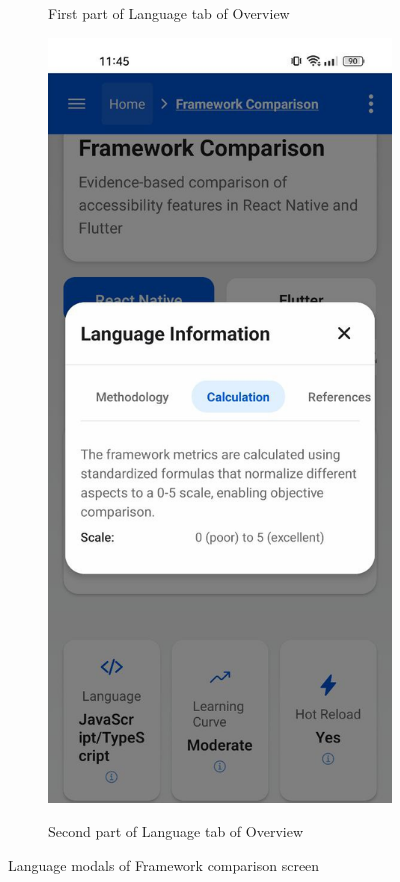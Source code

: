 \begin{figure}[ht]
\begin{subfigure}[b]{0.48\textwidth}
        \caption{First part of Language tab of Overview}
        \label{fig:language-1}
    \end{subfigure}
    \hfill
    \begin{subfigure}[b]{0.48\textwidth}
        \centering
        \includegraphics[width=\linewidth, alt={Second part of Language in Overview tab of the Framework comparison screen}]{img/language-calculation.jpg}
        \caption{Second part of Language tab of Overview}
        \label{fig:language-2}
    \end{subfigure}
    \caption{Language modals of Framework comparison screen}
    \label{fig:feature_implementation_sidebyside}
\end{figure}

